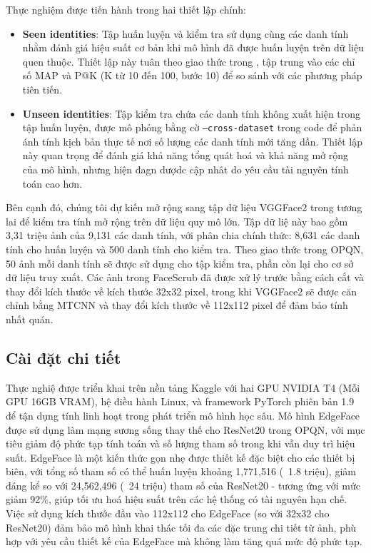 Thực nghiệm được tiến hành trong hai thiết lập chính:
\begin{itemize}
    \item \textbf{Seen identities}: Tập huấn luyện và kiểm tra sử dụng cùng các danh tính nhằm đánh giá hiệu suất cơ bản khi mô hình đã được huấn luyện trên dữ liệu quen thuộc. Thiết lập này tuân theo giao thức trong \cite {opqn}, tập trung vào các chỉ số MAP và P@K (K từ 10 đến 100, bước 10) để so sánh với các phương pháp tiên tiến.
    \item \textbf{Unseen identities}: Tập kiểm tra chứa các danh tính không xuất hiện trong tập huấn luyện, được mô phỏng bằng cờ \texttt{--cross-dataset} trong code để phản ánh tính kịch bản thực tế nơi số lượng các danh tính mới tăng dần. Thiết lập này quan trọng để đánh giá khả năng tổng quát hoá và khả năng mở rộng của mô hình, nhưng hiện đagn dượdc cập nhât do yêu cầu tài nguyên tính toán cao hơn.
\end {itemize}

Bên cạnh đó, chúng tôi dự kiến mở rộng sang tập dữ liệu VGGFace2 trong tương lai để kiểm tra tính mở rộng trên dữ liệu quy mô lớn. Tập dữ liệ này bao gồm 3,31 triệu ảnh của 9,131 các danh tính, với phân chia chính thức: 8,631 các danh tính cho huấn luyện và 500 danh tính cho kiểm tra. Theo giao thức trong OPQN, 50 ảnh mỗi danh tính sẽ được sử dụng cho tập kiểm tra, phần còn lại cho cơ sở dữ liệu truy xuất. Các ảnh trong FaceScrub đã được xử lý trước bằng cách cắt và thay đổi kích thước về kích thước 32x32 pixel, trong khi VGGFace2 sẽ được căn chỉnh bằng MTCNN và thay đổi kích thước về 112x112 pixel để đảm bảo tính nhất quán.

\subsection{Cài đặt chi tiết}
Thực nghiệ được triển khai trên nền tảng Kaggle với hai GPU NVIDIA T4 (Mỗi GPU 16GB VRAM), hệ điều hành Linux, và framework PyTorch phiên bản 1.9 để tận dụng tính linh hoạt trong phát triển mô hình học sâu. Mô hình EdgeFace được sử dụng làm mạng sương sống thay thế cho ResNet20 trong OPQN, với mục tiêu giảm độ phức tạp tính toán và số lượng tham số trong khi vẫn duy trì hiệu suất. EdgeFace là một kiến thức gọn nhẹ được thiết kế đặc biệt cho các thiết bị biên, với tổng số tham số có thể huấn luyện khoảng 1,771,516 (~1.8 triệu), giảm đáng kể so với 24,562,496 (~24 triệu) tham số của ResNet20 - tương ứng với mức giảm 92\%, giúp tối ưu hoá hiệu suất trên các hệ thống có tài nguyên hạn chế. Việc sử dụng kích thước đầu vào 112x112 cho EdgeFace (so với 32x32 cho ResNet20) đảm bảo mô hình khai thác tối đa các đặc trung chi tiết từ ảnh, phù hợp với yêu cầu thiết kế của EdgeFace mà không làm tăng quá mức độ phức tạp.

